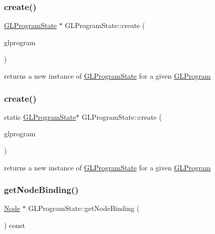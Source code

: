 \subsubsection{\texorpdfstring{create()}{create()}\hspace{0.1cm}{\footnotesize\ttfamily [1/2]}}
{\footnotesize\ttfamily \hyperlink{classGLProgramState}{G\+L\+Program\+State} $\ast$ G\+L\+Program\+State\+::create (\begin{DoxyParamCaption}\item[{\hyperlink{classGLProgram}{G\+L\+Program} $\ast$}]{glprogram }\end{DoxyParamCaption})\hspace{0.3cm}{\ttfamily [static]}}

returns a new instance of \hyperlink{classGLProgramState}{G\+L\+Program\+State} for a given \hyperlink{classGLProgram}{G\+L\+Program} \mbox{\label{classGLProgramState_a90eaf4f965c2db4272093f64ba5ec9dd}} 
\subsubsection{\texorpdfstring{create()}{create()}\hspace{0.1cm}{\footnotesize\ttfamily [2/2]}}
{\footnotesize\ttfamily static \hyperlink{classGLProgramState}{G\+L\+Program\+State}$\ast$ G\+L\+Program\+State\+::create (\begin{DoxyParamCaption}\item[{\hyperlink{classGLProgram}{G\+L\+Program} $\ast$}]{glprogram }\end{DoxyParamCaption})\hspace{0.3cm}{\ttfamily [static]}}

returns a new instance of \hyperlink{classGLProgramState}{G\+L\+Program\+State} for a given \hyperlink{classGLProgram}{G\+L\+Program} \mbox{\label{classGLProgramState_afd883d9c022e161039fcec12778a9963}} 
\subsubsection{\texorpdfstring{get\+Node\+Binding()}{getNodeBinding()}\hspace{0.1cm}{\footnotesize\ttfamily [1/2]}}
{\footnotesize\ttfamily \hyperlink{classNode}{Node} $\ast$ G\+L\+Program\+State\+::get\+Node\+Binding (\begin{DoxyParamCaption}{ }\end{DoxyParamCaption}) const}

